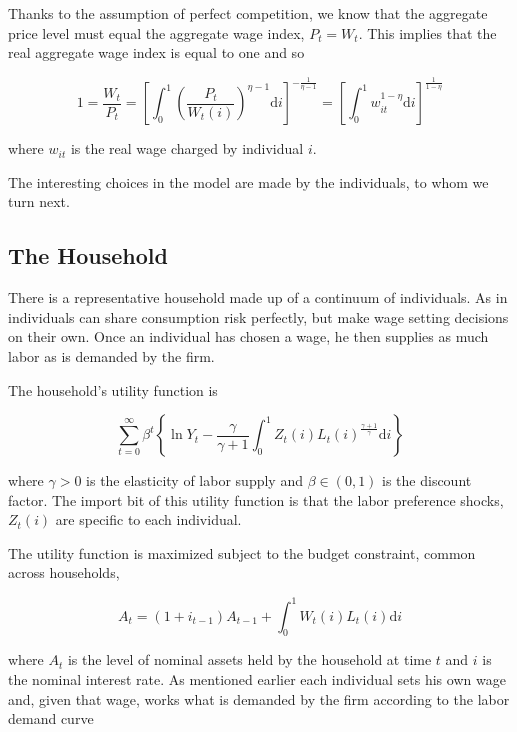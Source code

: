 \documentclass[12pt,a4paper]{scrartcl}            %
\begin{document}
Thanks to the assumption of perfect competition, we know that the aggregate price level must equal the aggregate wage index, $P_t = W_t$.  This implies that the real aggregate wage index is equal to one and so

\begin{equation} \label{eq:real_wage}
    1 = \frac{W_t}{P_t} = \left[\int_{0}^{1} \left( \frac{P_t}{W_t(i)} \right)^{\eta - 1} \mathrm{d}i \right]^{-\frac{1}{\eta - 1} } = \left[\int_{0}^{1} \! w_{it}^{1 - \eta} \mathrm{d}i \right]^{ \frac{1}{1 - \eta} }
\end{equation}

where $w_{it}$ is the real wage charged by individual $i$.

The interesting choices in the model are made by the individuals, to whom we turn next.

\subsection{The Household}
\label{sub:The Household}

There is a representative household made up of a continuum of individuals.
As in \cite{erceg_henderson_levin_1999} individuals can share consumption risk perfectly, but make wage setting decisions on their own.
Once an individual has chosen a wage, he then supplies as much labor as is demanded by the firm.

The household's utility function is

\begin{equation} \label{eq:utility}
    \sum_{t=0}^{\infty} \beta^t \left\{\ln Y_t - \frac{\gamma}{\gamma + 1} \int_{0}^{1} Z_t(i)L_t(i)^{\frac{\gamma + 1}{\gamma}}\mathrm{d}i\right\}
\end{equation}

where $\gamma > 0$ is the elasticity of labor supply and $\beta \in (0, 1)$ is the discount factor.
The import bit of this utility function is that the labor preference shocks, $Z_t(i)$ are specific to each individual.

The utility function is maximized subject to the budget constraint, common across households,

\begin{equation}
    \label{eq:budget}
    A_t = \left(1 + i_{t-1}\right)A_{t-1} + \int_{0}^{1} W_t(i)L_t(i)\mathrm{d}i
\end{equation}

where $A_t$ is the level of nominal assets held by the household at time $t$ and $i$ is the nominal interest rate.
As mentioned earlier each individual sets his own wage and, given that wage, works what is demanded by the firm according to the labor demand curve
\end{document}
